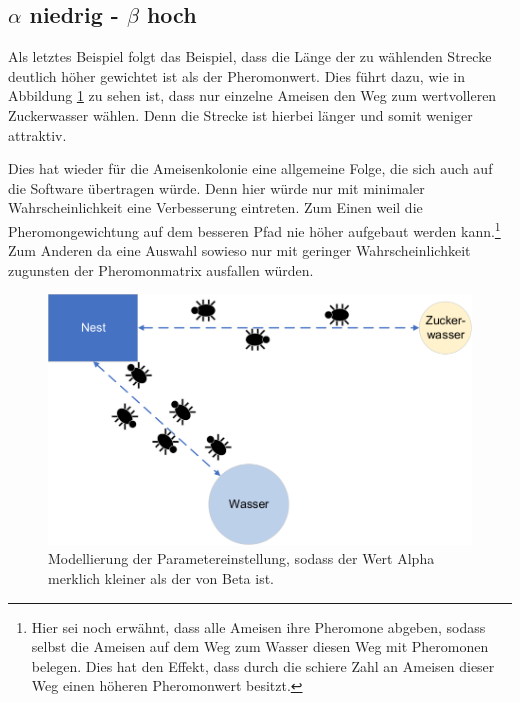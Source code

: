 {	\subsection{$\alpha$ niedrig - $\beta$ hoch}
	Als letztes Beispiel folgt das Beispiel, dass die Länge der zu wählenden Strecke deutlich höher gewichtet ist als der Pheromonwert. Dies führt dazu, wie in Abbildung \ref{parameter_a<b} zu sehen ist, dass nur einzelne Ameisen den Weg zum wertvolleren Zuckerwasser wählen. Denn die Strecke ist hierbei länger und somit weniger attraktiv.
	
	Dies hat wieder für die Ameisenkolonie eine allgemeine Folge, die sich auch auf die Software übertragen würde. Denn hier würde nur mit minimaler Wahrscheinlichkeit eine Verbesserung eintreten. Zum Einen weil die Pheromongewichtung auf dem besseren Pfad nie höher aufgebaut werden kann.\footnote{Hier sei noch erwähnt, dass alle Ameisen ihre Pheromone abgeben, sodass selbst die Ameisen auf dem Weg zum Wasser diesen Weg mit Pheromonen belegen. Dies hat den Effekt, dass durch die schiere Zahl an Ameisen dieser Weg einen höheren Pheromonwert besitzt.} Zum Anderen da eine Auswahl sowieso nur mit geringer Wahrscheinlichkeit zugunsten der Pheromonmatrix ausfallen würden.
	\begin{figure}[H]
		\centering
		\includegraphics[width=0.4\linewidth]{images/AntAlgorithm_alphaLbeta.png}
		\caption{Modellierung der Parametereinstellung, sodass der Wert Alpha merklich kleiner als der von Beta ist.}
		\label{parameter_a<b}
	\end{figure}
}